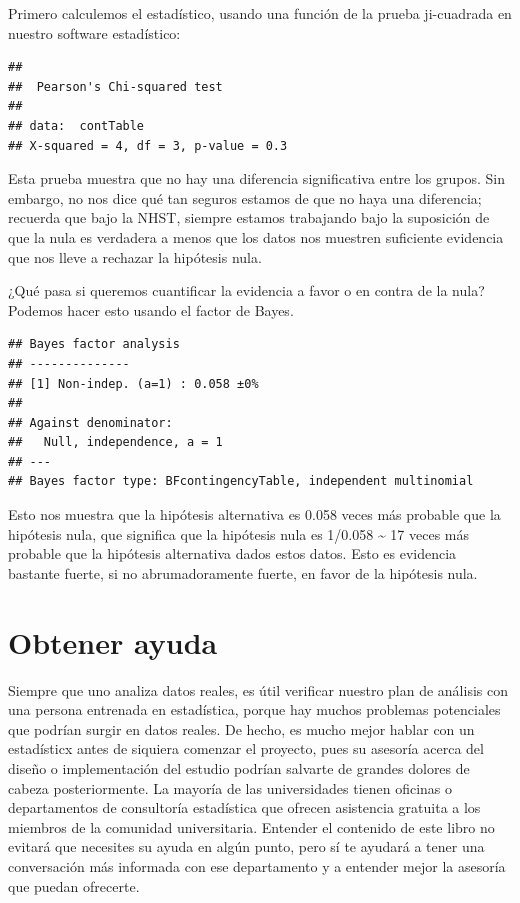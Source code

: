 \documentclass[
  12pt,
]{book}
\begin{document}
Primero calculemos el estadístico, usando una función de la prueba ji-cuadrada en nuestro software estadístico:

\begin{verbatim}
## 
##  Pearson's Chi-squared test
## 
## data:  contTable
## X-squared = 4, df = 3, p-value = 0.3
\end{verbatim}

Esta prueba muestra que no hay una diferencia significativa entre los grupos. Sin embargo, no nos dice qué tan seguros estamos de que no haya una diferencia; recuerda que bajo la NHST, siempre estamos trabajando bajo la suposición de que la nula es verdadera a menos que los datos nos muestren suficiente evidencia que nos lleve a rechazar la hipótesis nula.

¿Qué pasa si queremos cuantificar la evidencia a favor o en contra de la nula? Podemos hacer esto usando el factor de Bayes.

\begin{verbatim}
## Bayes factor analysis
## --------------
## [1] Non-indep. (a=1) : 0.058 ±0%
## 
## Against denominator:
##   Null, independence, a = 1 
## ---
## Bayes factor type: BFcontingencyTable, independent multinomial
\end{verbatim}

Esto nos muestra que la hipótesis alternativa es 0.058 veces más probable que la hipótesis nula, que significa que la hipótesis nula es 1/0.058 \textasciitilde{} 17 veces más probable que la hipótesis alternativa dados estos datos. Esto es evidencia bastante fuerte, si no abrumadoramente fuerte, en favor de la hipótesis nula.

\hypertarget{obtener-ayuda}{%
\section{Obtener ayuda}\label{obtener-ayuda}}

Siempre que uno analiza datos reales, es útil verificar nuestro plan de análisis con una persona entrenada en estadística, porque hay muchos problemas potenciales que podrían surgir en datos reales. De hecho, es mucho mejor hablar con un estadísticx antes de siquiera comenzar el proyecto, pues su asesoría acerca del diseño o implementación del estudio podrían salvarte de grandes dolores de cabeza posteriormente. La mayoría de las universidades tienen oficinas o departamentos de consultoría estadística que ofrecen asistencia gratuita a los miembros de la comunidad universitaria. Entender el contenido de este libro no evitará que necesites su ayuda en algún punto, pero sí te ayudará a tener una conversación más informada con ese departamento y a entender mejor la asesoría que puedan ofrecerte.
\end{document}

